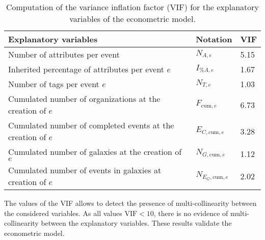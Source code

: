 \documentclass[unnumsec,webpdf,contemporary,large]{oup-authoring-template}%
\theoremstyle{thmstyleone}%
\theoremstyle{thmstyletwo}%
\theoremstyle{thmstylethree}%
\begin{document}
\begin{table}[!ht]
\centering
\caption{Computation of the variance inflation factor (VIF) for the explanatory variables of the econometric model.}
\begin{tabular}{lll}
Explanatory variables                                       & Notation  & VIF  \\ \hline
Number of attributes per event                              & $N_{A,e}$          & 5.15 \\
Inherited percentage of attributes per event $e$            & $I_{\%A,e}$        & 1.67 \\
Number of tags per event $e$                                & $N_{T,e}$          & 1.03 \\
Cumulated number of organizations at the creation of $e$    & $F_{\textrm{cum},e}$ & 6.73 \\
Cumulated number of completed events at the creation of $e$ & $E_{C,\textrm{cum},e}$       & 3.28 \\
Cumulated number of galaxies at the creation of $e$         & $N_{G,\textrm{cum},e}$      & 1.12 \\
Cumulated number of events in galaxies at creation of $e$   & $N_{E_G, \textrm{cum}, e}$  & 2.02\\
\hline
\end{tabular}
\begin{tablenotes}
\item The values of the VIF allows to detect the presence of multi-collinearity between the considered variables. As all values $\textrm{VIF} < 10$, there is no evidence of multi-collinearity between the explanatory variables. These results validate the econometric model.
\end{tablenotes}
\label{tab:VIF}
\end{table}
\end{document}
